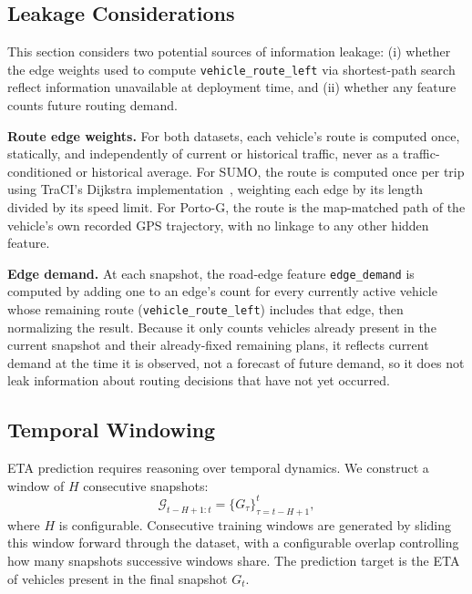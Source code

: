 \documentclass[pdflatex,sn-basic,Numbered]{sn-jnl}%
\begin{document}
\subsection{Leakage Considerations}\label{sec:leakage}
This section considers two potential sources of information leakage: (i) whether the edge weights used to compute \texttt{vehicle\_route\_left} via shortest-path search reflect information unavailable at deployment time, and (ii) whether any feature counts future routing demand.

\textbf{Route edge weights.} For both datasets, each vehicle's route is computed once, statically, and independently of current or historical traffic, never as a traffic-conditioned or historical average. For SUMO, the route is computed once per trip using TraCI's Dijkstra implementation~\cite{SUMO2018,dijkstra1959}, weighting each edge by its length divided by its speed limit. For Porto-G, the route is the map-matched path of the vehicle's own recorded GPS trajectory, with no linkage to any other hidden feature.

\textbf{Edge demand.} At each snapshot, the road-edge feature \texttt{edge\_demand} is computed by adding one to an edge's count for every currently active vehicle whose remaining route (\texttt{vehicle\_route\_left}) includes that edge, then normalizing the result. Because it only counts vehicles already present in the current snapshot and their already-fixed remaining plans, it reflects current demand at the time it is observed, not a forecast of future demand, so it does not leak information about routing decisions that have not yet occurred.

\subsection{Temporal Windowing}
ETA prediction requires reasoning over temporal dynamics. We construct a window of $H$ consecutive snapshots:
\begin{equation}
\mathcal{G}_{t-H+1:t} = \{G_\tau\}_{\tau=t-H+1}^t,
\end{equation}
where $H$ is configurable. Consecutive training windows are generated by sliding this window forward through the dataset, with a configurable overlap controlling how many snapshots successive windows share. The prediction target is the ETA of vehicles present in the final snapshot $G_t$.
\end{document}
